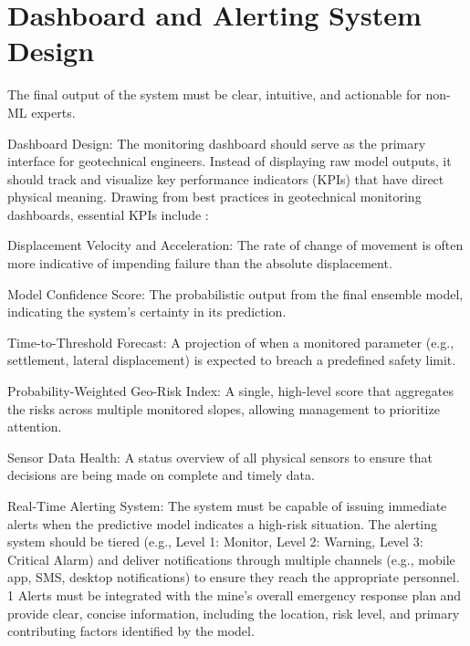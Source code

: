 \documentclass{article}
\begin{document}
\section{Dashboard and Alerting System Design}

The final output of the system must be clear, intuitive, and actionable for non-ML experts.

Dashboard Design: The monitoring dashboard should serve as the primary interface for geotechnical engineers. Instead of displaying raw model outputs, it should track and visualize key performance indicators (KPIs) that have direct physical meaning. Drawing from best practices in geotechnical monitoring dashboards, essential KPIs include :   

Displacement Velocity and Acceleration: The rate of change of movement is often more indicative of impending failure than the absolute displacement.

Model Confidence Score: The probabilistic output from the final ensemble model, indicating the system's certainty in its prediction.

Time-to-Threshold Forecast: A projection of when a monitored parameter (e.g., settlement, lateral displacement) is expected to breach a predefined safety limit.

Probability-Weighted Geo-Risk Index: A single, high-level score that aggregates the risks across multiple monitored slopes, allowing management to prioritize attention.

Sensor Data Health: A status overview of all physical sensors to ensure that decisions are being made on complete and timely data.

Real-Time Alerting System: The system must be capable of issuing immediate alerts when the predictive model indicates a high-risk situation. The alerting system should be tiered (e.g., Level 1: Monitor, Level 2: Warning, Level 3: Critical Alarm) and deliver notifications through multiple channels (e.g., mobile app, SMS, desktop notifications) to ensure they reach the appropriate personnel. 1  Alerts must be integrated with the mine's overall emergency response plan and provide clear, concise information, including the location, risk level, and primary contributing factors identified by the model.

 
\end{document}
